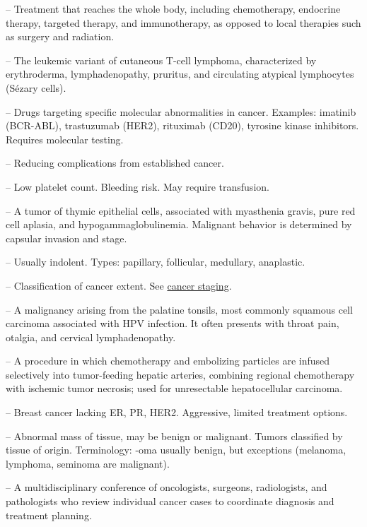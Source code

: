 -- Treatment that reaches the whole body, including chemotherapy, endocrine therapy, targeted therapy, and immunotherapy, as opposed to local therapies such as surgery and radiation.

-- The leukemic variant of cutaneous T-cell lymphoma, characterized by erythroderma, lymphadenopathy, pruritus, and circulating atypical lymphocytes (Sézary cells).

-- Drugs targeting specific molecular abnormalities in cancer. Examples: imatinib (BCR-ABL), trastuzumab (HER2), rituximab (CD20), tyrosine kinase inhibitors. Requires molecular testing.

-- Reducing complications from established cancer.

-- Low platelet count. Bleeding risk. May require transfusion.

-- A tumor of thymic epithelial cells, associated with myasthenia gravis, pure red cell aplasia, and hypogammaglobulinemia. Malignant behavior is determined by capsular invasion and stage.

-- Usually indolent. Types: papillary, follicular, medullary, anaplastic.

-- Classification of cancer extent. See \hyperlink{Cancer Staging}{cancer staging}.

-- A malignancy arising from the palatine tonsils, most commonly squamous cell carcinoma associated with HPV infection. It often presents with throat pain, otalgia, and cervical lymphadenopathy.

-- A procedure in which chemotherapy and embolizing particles are infused selectively into tumor-feeding hepatic arteries, combining regional chemotherapy with ischemic tumor necrosis; used for unresectable hepatocellular carcinoma.

-- Breast cancer lacking ER, PR, HER2. Aggressive, limited treatment options.

-- Abnormal mass of tissue, may be benign or malignant. Tumors classified by tissue of origin. Terminology: -oma usually benign, but exceptions (melanoma, lymphoma, seminoma are malignant).

-- A multidisciplinary conference of oncologists, surgeons, radiologists, and pathologists who review individual cancer cases to coordinate diagnosis and treatment planning.


